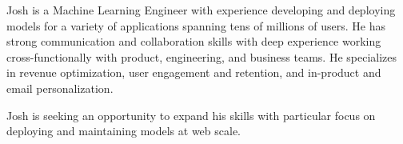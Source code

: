 

\begin{cvparagraph}

Josh is a Machine Learning Engineer with experience developing and deploying models for a variety of applications spanning tens of millions of users. 
He has strong communication and collaboration skills with deep experience working cross-functionally with product, engineering, and business teams. 
He specializes in revenue optimization, user engagement and retention, and in-product and email personalization.

Josh is seeking an opportunity to expand his skills with particular focus on deploying and maintaining models at web scale.

\end{cvparagraph}
